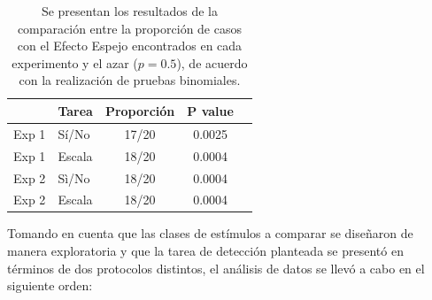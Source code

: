 \begin{table}
\caption[Pruebas Binomiales que comparan la proporción de patrones de Efecto Espejo encontrados]{Se presentan los resultados de la comparación entre la proporción de casos con el Efecto Espejo encontrados en cada experimento y el azar ($p=0.5$), de acuerdo con la realización de pruebas binomiales.}
\label{Tabla_Binom}
\centering
\begin{tabular}{l l | c c c}
\toprule
\textbf{} & \textbf{Tarea} & \textbf{Proporción} & \textbf{P value}\\
\midrule
Exp 1 & Sí/No & 17/20 & 0.0025 \\
Exp 1 & Escala & 18/20 & 0.0004\\
Exp 2 & Sì/No & 18/20 & 0.0004\\
Exp 2 & Escala & 18/20 & 0.0004\\
\bottomrule
\end{tabular}
\end{table}


Tomando en cuenta que las clases de estímulos a comparar se diseñaron de manera exploratoria y que la tarea de detección planteada se presentó en términos de dos protocolos distintos, el análisis de datos se llevó a cabo en el siguiente orden:\\

